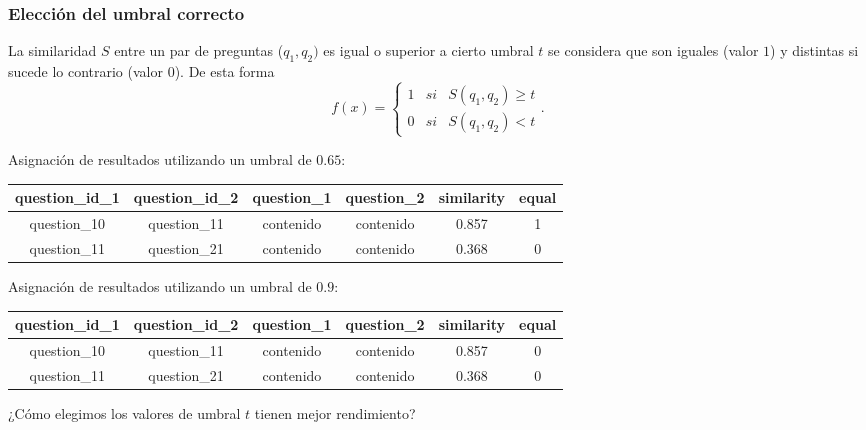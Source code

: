 \begin{frame}[allowframebreaks]
	\frametitle{Elección del umbral correcto}
	La similaridad \(S\) entre un par de preguntas (\(q_1,q_2)\) es igual o superior a cierto umbral \(t\) se considera que son iguales (valor \(1\)) y distintas si sucede lo contrario (valor \(0\)). De esta forma
	\[f(x) = \left\{ \begin{array}{lcc} 1 & si & S(q_1, q_2)\geq t
		\\ 0 & si & S(q_1, q_2) < t
	\end{array} \right..\]

	\framebreak

	Asignación de resultados utilizando un umbral de \(0.65\):
	\begin{table}[h!]
		\scriptsize
		\begin{tabularx}{\textwidth}{cccccc}
			\toprule
			\textbf{question\_id\_1} & \textbf{question\_id\_2} & \textbf{question\_1} & \textbf{question\_2}  & \textbf{similarity} & \textbf{equal} \\
			\midrule
			question\_10             & question\_11             & contenido            & contenido            & 0.857  & 1              \\
			question\_11             & question\_21             & contenido            & contenido            & 0.368  & 0              \\
			\bottomrule
		\end{tabularx}
		\label{tab:umbral-validacion-1}
	\end{table}

	Asignación de resultados utilizando un umbral de \(0.9\):
	\begin{table}[h!]
		\scriptsize
		\begin{tabularx}{\textwidth}{cccccc}
			\toprule
			\textbf{question\_id\_1} & \textbf{question\_id\_2} & \textbf{question\_1} & \textbf{question\_2}  & \textbf{similarity} & \textbf{equal} \\
			\midrule
			question\_10             & question\_11             & contenido            & contenido            & 0.857 & 0              \\
			question\_11             & question\_21             & contenido            & contenido            & 0.368 & 0              \\
			\bottomrule
		\end{tabularx}
		\label{tab:umbral-validacion-2}
	\end{table}

	\begin{center}
		\centering	¿Cómo elegimos los valores de umbral \(t\) tienen mejor rendimiento?
	\end{center}


\end{frame}

